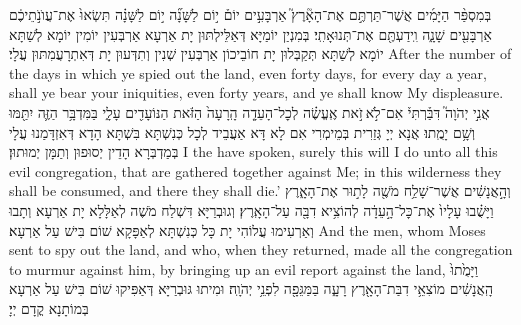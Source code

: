 {בְּמִסְפַּ֨ר הַיָּמִ֜ים אֲשֶׁר־תַּרְתֶּ֣ם אֶת־הָאָ֘רֶץ֮ אַרְבָּעִ֣ים יוֹם֒ י֣וֹם לַשָּׁנָ֞ה י֣וֹם לַשָּׁנָ֗ה תִּשְׂאוּ֙ אֶת־עֲוֺנֹ֣תֵיכֶ֔ם אַרְבָּעִ֖ים שָׁנָ֑ה וִֽידַעְתֶּ֖ם אֶת־תְּנוּאָתִֽי׃
}
{בְּמִנְיַן יוֹמַיָּא דְּאַלֵּילְתּוּן יָת אַרְעָא אַרְבְּעִין יוֹמִין יוֹמָא לְשַׁתָּא יוֹמָא לְשַׁתָּא תְּקַבְּלוּן יָת חוֹבֵיכוֹן אַרְבְּעִין שְׁנִין וְתִדְּעוּן יָת דְּאִתְרָעֲמִתּוּן עֲלָי׃}
{After the number of the days in which ye spied out the land, even forty days, for every day a year, shall ye bear your iniquities, even forty years, and ye shall know My displeasure.}{}
{אֲנִ֣י יְהֹוָה֮ דִּבַּ֒רְתִּי֒ אִם־לֹ֣א \legarmeh  זֹ֣את אֶֽעֱשֶׂ֗ה לְכׇל־הָעֵדָ֤ה הָֽרָעָה֙ הַזֹּ֔את הַנּוֹעָדִ֖ים עָלָ֑י בַּמִּדְבָּ֥ר הַזֶּ֛ה יִתַּ֖מּוּ וְשָׁ֥ם יָמֻֽתוּ׃}
{אֲנָא יְיָ גְּזַרִית בְּמֵימְרִי אִם לָא דָּא אַעֲבֵיד לְכָל כְּנִשְׁתָּא בִּשְׁתָּא הָדָא דְּאִזְדָּמַנוּ עֲלָי בְּמַדְבְּרָא הָדֵין יְסוּפוּן וְתַמָּן יְמוּתוּן׃}
{I the \lord\space have spoken, surely this will I do unto all this evil congregation, that are gathered together against Me; in this wilderness they shall be consumed, and there they shall die.’}{}
{וְהָ֣אֲנָשִׁ֔ים אֲשֶׁר־שָׁלַ֥ח מֹשֶׁ֖ה לָת֣וּר אֶת־הָאָ֑רֶץ וַיָּשֻׁ֗בוּ  עָלָיו֙ אֶת־כׇּל־הָ֣עֵדָ֔ה לְהוֹצִ֥יא דִבָּ֖ה עַל־הָאָֽרֶץ׃
}
{וְגוּבְרַיָּא דִּשְׁלַח מֹשֶׁה לְאַלָּלָא יָת אַרְעָא וְתָבוּ וְאַרְעִימוּ עֲלוֹהִי יָת כָּל כְּנִשְׁתָּא לְאַפָּקָא שׁוֹם בִּישׁ עַל אַרְעָא׃}
{And the men, whom Moses sent to spy out the land, and who, when they returned, made all the congregation to murmur against him, by bringing up an evil report against the land,}{}
{וַיָּמֻ֙תוּ֙ הָֽאֲנָשִׁ֔ים מוֹצִאֵ֥י דִבַּת־הָאָ֖רֶץ רָעָ֑ה בַּמַּגֵּפָ֖ה לִפְנֵ֥י יְהֹוָֽה׃
}
{וּמִיתוּ גּוּבְרַיָּא דְּאַפִּיקוּ שׁוֹם בִּישׁ עַל אַרְעָא בְּמוֹתָנָא קֳדָם יְיָ׃}
